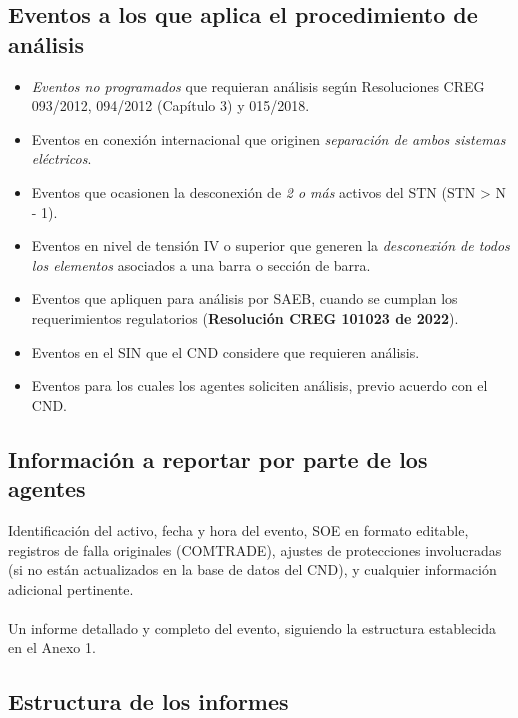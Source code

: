 \documentclass[a5paper]{book}%
\begin{document}
\subsection{Eventos a los que aplica el procedimiento de análisis}

\begin{itemize}
	\item\textit{ Eventos no programados} que requieran análisis según Resoluciones CREG 093/2012, 094/2012 (Capítulo 3) y 015/2018.
	\item Eventos en conexión internacional que originen \textit{separación de ambos sistemas eléctricos}.
	
	\item Eventos que ocasionen la desconexión de \textit{2 o más} activos del STN (STN > N - 1).
	
	\item Eventos en nivel de tensión IV o superior que generen la \textit{desconexión de todos los elementos} asociados a una barra o sección de barra.
	
	\item Eventos que apliquen para análisis por \ac{SAEB}, cuando se cumplan los requerimientos regulatorios (\textbf{Resolución CREG 101023 de 2022}).
	
	\item Eventos en el SIN que el CND considere que requieren análisis.
	
	\item Eventos para los cuales los agentes soliciten análisis, previo acuerdo con el CND.
	
\end{itemize}

\subsection{Información a reportar por parte de los agentes}

Identificación del activo, fecha y hora del evento, \ac{SOE} en formato editable, registros de falla originales (COMTRADE), ajustes de protecciones involucradas (si no están actualizados en la base de datos del CND), y cualquier información adicional pertinente.\\\\
Un informe detallado y completo del evento, siguiendo la estructura establecida en el Anexo 1.

\subsection{Estructura de los informes}
\end{document}
